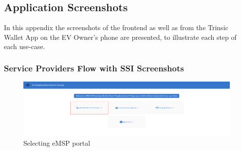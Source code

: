 \newpage    %

\subsection{Application Screenshots}
\label{app:application_screenshots}

In this appendix the screenshots of the frontend as well as from the Trinsic Wallet App on the EV Owner's phone are presented, to illustrate each step of each use-case.

\subsubsection{Service Providers Flow with SSI Screenshots}
\label{subapp:service_providers_flow}

\begin{figure}[H]
    \centering
    \includegraphics[width=\linewidth]{images/Frontend/eMSP/Screenshot1.png}
    \caption[]{Selecting eMSP portal}
    \label{fig:service_provider_screenshot_1}
\end{figure}

